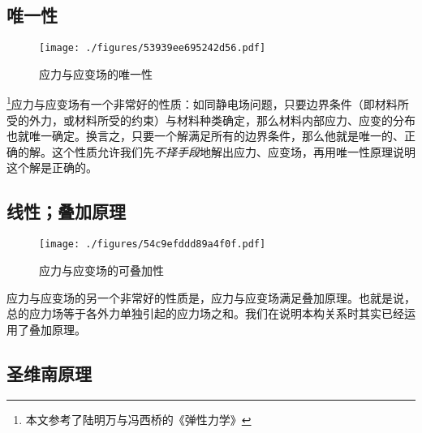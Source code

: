 
\begin{issues}
\issueDraft
\end{issues}


\subsection{唯一性}
\begin{figure}[ht]
\centering
\texttt{[image: ./figures/53939ee695242d56.pdf]}
\caption{应力与应变场的唯一性} \label{fig_SSPRN_1}
\end{figure}
\footnote{本文参考了陆明万与冯西桥的《弹性力学》}应力与应变场有一个非常好的性质：如同静电场问题，只要边界条件（即材料所受的外力，或材料所受的约束）与材料种类确定，那么材料内部应力、应变的分布也就唯一确定。换言之，只要一个解满足所有的边界条件，那么他就是唯一的、正确的解。这个性质允许我们先\textsl{不择手段}地解出应力、应变场，再用唯一性原理说明这个解是正确的。

\subsection{线性；叠加原理}
\begin{figure}[ht]
\centering
\texttt{[image: ./figures/54c9efddd89a4f0f.pdf]}
\caption{应力与应变场的可叠加性} \label{fig_SSPRN_2}
\end{figure}
应力与应变场的另一个非常好的性质是，应力与应变场满足叠加原理。也就是说，总的应力场等于各外力单独引起的应力场之和。我们在说明本构关系时其实已经运用了叠加原理。%

\subsection{圣维南原理}
